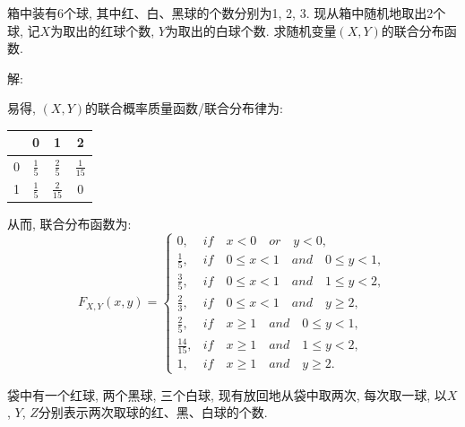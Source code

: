 \documentclass[standard]{ExBook}
\begin{document}
\begin{qitems}
    \begin{bbox}
    \begin{shaded}
        \qitem 
箱中装有6个球, 其中红、白、黑球的个数分别为1, 2, 3. 现从箱中随机地取出2个球, 记$X$为取出的红球个数, $Y$为取出的白球个数. 求随机变量$(X,Y)$的联合分布函数.
    \end{shaded}
    \end{bbox}

\vspace{-5em}

    \begin{bbox}
解: 

易得, $(X,Y)$的联合概率质量函数/联合分布律为:
\begin{footnotesize}
\begin{center}
    \renewcommand{\arraystretch}{1.7}
    \setlength{\tabcolsep}{25pt}
    \begin{tabular}{c|c|c|c}
	    \hline
	    \diagbox{$X$}{$P(X,Y)$}{$Y$} & 0 & 1 & 2 \\
	    \hline
	    0 & $\displaystyle\frac{1}{5}$ & $\displaystyle\frac{2}{5}$ & $\displaystyle\frac{1}{15}$\\
	    \hline
	    1 & $\displaystyle\frac{1}{5}$ & $\displaystyle\frac{2}{15}$ & 0\\
	    \hline
    \end{tabular}
\end{center}
\end{footnotesize}
从而, 联合分布函数为:
\[
F_{X,Y}(x, y) = 
\begin{cases} 
0, & if\quad x < 0\quad or\quad y < 0, \\ 
\frac{1}{5}, & if\quad 0 \leq x < 1\quad and\quad 0 \leq y < 1, \\ 
\frac{3}{5}, & if\quad 0 \leq x < 1\quad and\quad 1 \leq y < 2, \\ 
\frac{2}{3}, & if\quad 0 \leq x < 1\quad and\quad y \geq 2, \\ 
\frac{2}{5}, & if\quad x \geq 1\quad and\quad 0 \leq y < 1, \\ 
\frac{14}{15}, & if\quad x \geq 1\quad and\quad 1 \leq y < 2, \\ 
1, & if\quad x \geq 1\quad and\quad y \geq 2. 
\end{cases}
\]
    \end{bbox}

\vspace{-5em}

    \begin{bbox}
    \begin{shaded}
        \qitem
袋中有一个红球, 两个黑球, 三个白球, 现有放回地从袋中取两次, 每次取一球, 以$X$, $Y$, $Z$分别表示两次取球的红、黑、白球的个数.


\end{shaded}
\end{bbox}
\end{qitems}
\end{document}
